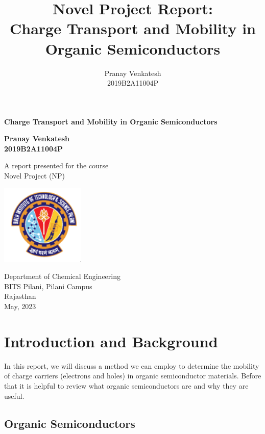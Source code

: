 \documentclass{article}
\title{Novel Project Report: \\ Charge Transport and Mobility in Organic Semiconductors}
\author{Pranay Venkatesh \\ 2019B2A11004P}
\begin{document}
\begin{titlepage}
   \begin{center}
       \vspace*{1cm}

       \textbf{Charge Transport and Mobility in Organic Semiconductors}
            
       \vspace{1.5cm}

       \textbf{Pranay Venkatesh \\ 2019B2A11004P}

       \vspace{4cm}
            
       A report presented for the course\\
       Novel Project (NP)
            
       \vspace{0.8cm}
     
       \includegraphics[width=0.3\textwidth]{university}
            
       Department of Chemical Engineering\\
       BITS Pilani, Pilani Campus\\
       Rajasthan\\
       May, 2023
            
   \end{center}
\end{titlepage}


\tableofcontents

\pagebreak


\section{Introduction and Background}

In this report, we will discuss a method we can employ to determine the mobility of charge carriers (electrons and holes) in organic semiconductor materials. Before that it is helpful to review what organic semiconductors are and why they are useful.

\subsection{Organic Semiconductors}
\end{document}
